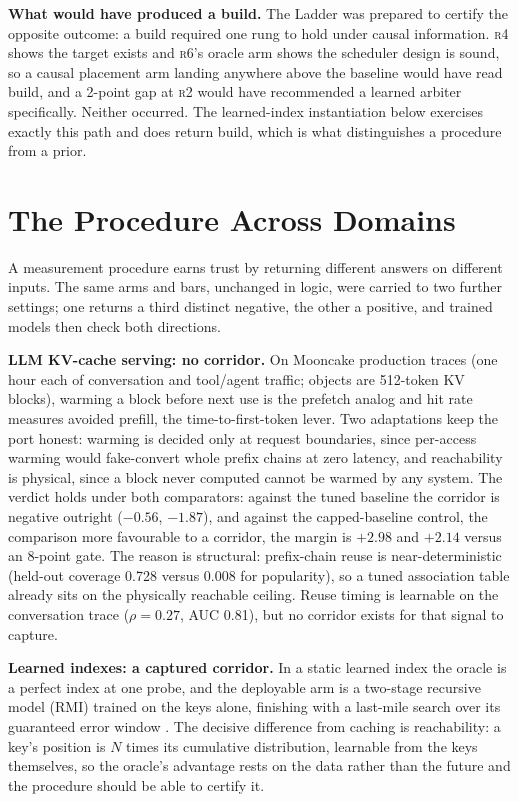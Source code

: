 \documentclass[letterpaper]{article} %
\newcommand{\rung}[1]{\textsc{#1}}
\begin{document}
\textbf{What would have produced a build.} The Ladder was prepared to certify the opposite outcome: a build required one rung to hold under causal information. \rung{r4} shows the target exists and \rung{r6}'s oracle arm shows the scheduler design is sound, so a causal placement arm landing anywhere above the baseline would have read build, and a 2-point gap at \rung{r2} would have recommended a learned arbiter specifically. Neither occurred. The learned-index instantiation below exercises exactly this path and does return build, which is what distinguishes a procedure from a prior.

\section{The Procedure Across Domains}
A measurement procedure earns trust by returning different answers on different inputs. The same arms and bars, unchanged in logic, were carried to two further settings; one returns a third distinct negative, the other a positive, and trained models then check both directions.

\textbf{LLM KV-cache serving: no corridor.} On Mooncake production traces \citep{mooncake} (one hour each of conversation and tool/agent traffic; objects are 512-token KV blocks), warming a block before next use is the prefetch analog and hit rate measures avoided prefill, the time-to-first-token lever. Two adaptations keep the port honest: warming is decided only at request boundaries, since per-access warming would fake-convert whole prefix chains at zero latency, and reachability is physical, since a block never computed cannot be warmed by any system. The verdict holds under both comparators: against the tuned baseline the corridor is negative outright ($-0.56$, $-1.87$), and against the capped-baseline control, the comparison more favourable to a corridor, the margin is $+2.98$ and $+2.14$ versus an 8-point gate. The reason is structural: prefix-chain reuse is near-deterministic (held-out coverage 0.728 versus 0.008 for popularity), so a tuned association table already sits on the physically reachable ceiling. Reuse timing is learnable on the conversation trace ($\rho{=}0.27$, AUC 0.81), but no corridor exists for that signal to capture.

\textbf{Learned indexes: a captured corridor.} In a static learned index the oracle is a perfect index at one probe, and the deployable arm is a two-stage recursive model (RMI) trained on the keys alone, finishing with a last-mile search over its guaranteed error window \citep{kraska}. The decisive difference from caching is reachability: a key's position is $N$ times its cumulative distribution, learnable from the keys themselves, so the oracle's advantage rests on the data rather than the future and the procedure should be able to certify it.
\end{document}
